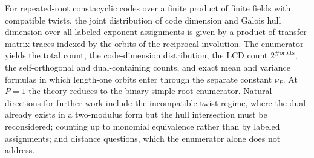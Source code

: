 \documentclass[11pt]{article}
\theoremstyle{definition}
\theoremstyle{remark}
\begin{document}
For repeated-root constacyclic codes over a finite product of finite
fields with compatible twists, the joint distribution of code dimension and
Galois hull dimension over all labeled exponent assignments is given by
a product of transfer-matrix traces indexed by the orbits of the
reciprocal involution. The enumerator yields the total count, the
code-dimension distribution, the LCD count \(2^{\#\mathrm{orbits}}\), the
self-orthogonal and dual-containing counts, and exact mean and variance
formulas in which length-one orbits enter through the separate constant
\(\nu_P\). At \(P=1\) the theory reduces to the binary simple-root
enumerator. Natural directions for further work include the
incompatible-twist regime, where the dual already exists in a
two-modulus form but the hull intersection must be reconsidered;
counting up to monomial equivalence rather than by labeled assignments;
and distance questions, which the enumerator alone does not address.
\end{document}
